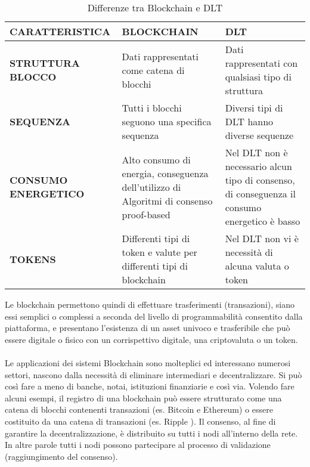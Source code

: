 \begin{table}[h!]
\centering
\begin{tabular}{ | l | p{3.4cm} | p{3.4cm} | }
\hline
    \toprule
\textbf{CARATTERISTICA}      
& \textbf{BLOCKCHAIN}   
& \textbf{DLT} \\\midrule
\hline
\textbf{STRUTTURA BLOCCO}
& Dati rappresentati come catena di blocchi
& Dati rappresentati con qualsiasi tipo di struttura \\\hline
\textbf{SEQUENZA}
& Tutti i blocchi seguono una specifica sequenza 
& Diversi tipi di DLT hanno diverse sequenze \\\hline
\textbf{CONSUMO ENERGETICO}
& Alto consumo di energia, conseguenza dell'utilizzo di Algoritmi di consenso proof-based 
& Nel DLT non è necessario alcun tipo di consenso, di conseguenza il consumo energetico è basso \\\hline
\textbf{TOKENS}
& Differenti tipi di token e valute per differenti tipi di blockchain 
& Nel DLT non vi è necessità di alcuna valuta o token \\
    \bottomrule
\hline
\end{tabular}
\caption{Differenze tra Blockchain e DLT}
\label{tab: blockchainDLT}
\end{table}

Le blockchain permettono quindi di effettuare trasferimenti (transazioni), siano essi semplici o complessi a seconda del livello di programmabilità consentito dalla piattaforma, e presentano l'esistenza di un asset univoco e trasferibile che può essere digitale o fisico con un corrispettivo digitale, una criptovaluta o un token.
\\
\\
Le applicazioni dei sistemi Blockchain sono molteplici ed interessano numerosi settori, nascono dalla necessità di eliminare intermediari e decentralizzare. Si può così fare a meno di banche, notai, istituzioni finanziarie e così via.
Volendo fare alcuni esempi, il registro di una blockchain può essere strutturato come una catena di blocchi contenenti transazioni (es. Bitcoin e Ethereum) o essere costituito da una catena di transazioni (es. Ripple \cite{armknecht2015ripple}). Il consenso, al fine di garantire la decentralizzazione, è distribuito su tutti i nodi all'interno della rete. In altre parole tutti i nodi possono partecipare al processo di validazione (raggiungimento del consenso).

